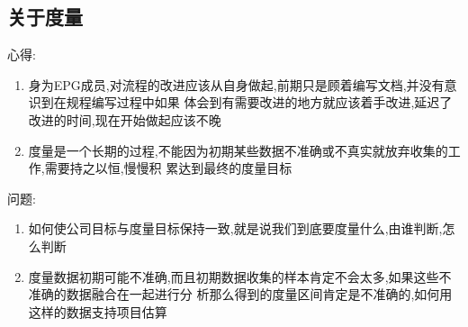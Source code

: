\documentclass[11pt]{article}
\begin{document}
\subsection{关于度量}

\begin{staff}
\slogo 心得:
\begin{enumerate}
\item 身为EPG成员,对流程的改进应该从自身做起,前期只是顾着编写文档,并没有意识到在规程编写过程中如果
  体会到有需要改进的地方就应该着手改进,延迟了改进的时间,现在开始做起应该不晚
\item 度量是一个长期的过程,不能因为初期某些数据不准确或不真实就放弃收集的工作,需要持之以恒,慢慢积
  累达到最终的度量目标
\end{enumerate}

问题:
\begin{enumerate}
 \item 如何使公司目标与度量目标保持一致,就是说我们到底要度量什么,由谁判断,怎么判断
 \item 度量数据初期可能不准确,而且初期数据收集的样本肯定不会太多,如果这些不准确的数据融合在一起进行分
析那么得到的度量区间肯定是不准确的,如何用这样的数据支持项目估算
\end{enumerate}

\end{staff}
\end{document}
